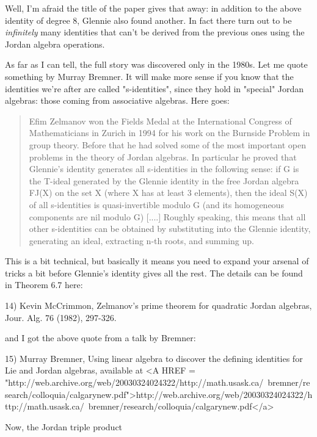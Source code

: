 Well, I'm afraid the title of the paper gives that away: in addition to
the above identity of degree 8, Glennie also found another.  In fact
there turn out to be \emph{infinitely} many identities that can't be derived
from the previous ones using the Jordan algebra operations.

As far as I can tell, the full story was discovered only in the 1980s.
Let me quote something by Murray Bremner.  It will make more sense if
you know that the identities we're after are called "s-identities",
since they hold in "special" Jordan algebras: those coming from
associative algebras.  Here goes:

\begin{quote}
   Efim Zelmanov won the Fields Medal at the International Congress of
   Mathematicians in Zurich in 1994 for his work on the Burnside Problem
   in group theory. Before that he had solved some of the most important
   open problems in the theory of Jordan algebras.  In particular he
   proved that Glennie's identity generates all s-identities in the
   following sense: if G is the T-ideal generated by the Glennie
   identity in the free Jordan algebra FJ(X) on the set X (where X has
   at least 3 elements), then the ideal S(X) of all s-identities is
   quasi-invertible modulo G (and its homogeneous components are nil
   modulo G) [....] Roughly speaking, this means that all other
   s-identities can be obtained by substituting into the Glennie
   identity, generating an ideal, extracting n-th roots, and summing up.

\end{quote}
    
This is a bit technical, but basically it means you need to expand your
arsenal of tricks a bit before Glennie's identity gives all the rest.
The details can be found in Theorem 6.7 here:

14) Kevin McCrimmon, Zelmanov's prime theorem for quadratic Jordan 
algebras, Jour. Alg. 76 (1982), 297-326. 

and I got the above quote from a talk by Bremner:

15) Murray Bremner, Using linear algebra to discover the defining
identities for Lie and Jordan algebras, available at 
<A HREF = "http://web.archive.org/web/20030324024322/http://math.usask.ca/~bremner/research/colloquia/calgarynew.pdf">http://web.archive.org/web/20030324024322/http://math.usask.ca/~bremner/research/colloquia/calgarynew.pdf</a>

Now, the Jordan triple product

